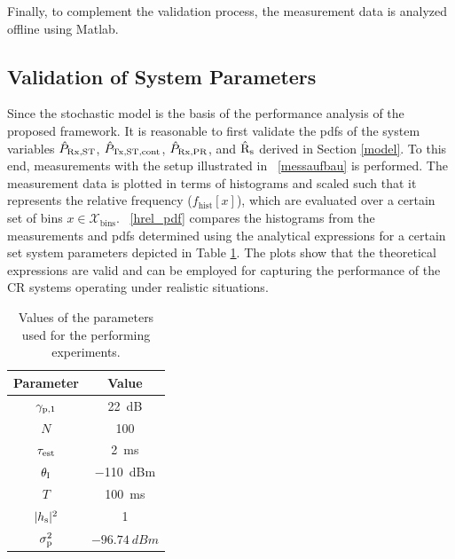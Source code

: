 Finally, to complement the validation process, the measurement data is analyzed offline using Matlab.

\subsection{Validation of System Parameters}

Since the stochastic model is the basis of the performance analysis of the proposed framework. It is reasonable to first validate the pdfs of the system variables $\hat{P}_{\text{Rx,ST}}$, $\hat{P}_{\text{Tx,ST,cont}}$, $\hat{P}_{\text{Rx,PR}}$, and $\hat{\text{{R}}}_{\text{s}}$ derived in Section \ref{model}. To this end, measurements with the setup illustrated in \figurename~\ref{messaufbau} is performed. The measurement data is plotted in terms of histograms and scaled such that it represents the relative frequency ($f_\textrm{hist}[x]$), which are evaluated over a certain set of bins $x \in \mathcal X_\text{bins}$. \figurename~\ref{hrel_pdf} compares the histograms from the measurements and pdfs determined using the analytical expressions for a certain set system parameters depicted in Table \ref{param}. The plots show that the theoretical expressions are valid and can be employed for capturing the performance of the CR systems operating under realistic situations. 


\begin{table}
	\renewcommand{\arraystretch}{1.4}
	\centering
	\caption{Values of the parameters used for the performing experiments.}
	\label{param}
	\begin{tabular}{c||c}
		\bfseries Parameter & \bfseries Value \\ \hline \hline
		${\gamma}_{\text{p,1}}$ & \SI{22}{dB} \\
		$N$ & 100 \\
		$\tau_{\text{est}}$ & \SI{2}{ms}\\
		$\theta_{\text{I}}$ & \SI{-110}{dBm}\\
		$T$ & \SI{100}{ms}\\
		$|h_{\text{s}}|^2$ & 1 \\
		$\sigma^2_{\text{p}}$ & $\SI{-96.74}{dBm}$\\ \hline
	\end{tabular}
\end{table}

